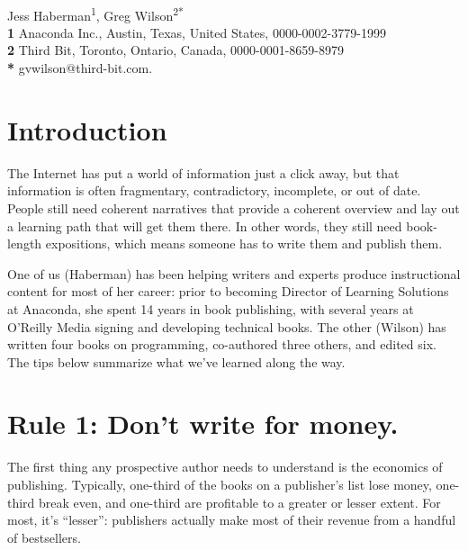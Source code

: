 \documentclass[10pt,letterpaper]{article}
\begin{document}
\vspace*{0.2in}

\begin{flushleft}
{\Large
\textbf{}
}
\newline
\\
{Jess Haberman}\textsuperscript{1},
{Greg Wilson}\textsuperscript{2*}
\\
\bigskip
\textbf{1} Anaconda Inc., Austin, Texas, United States, 0000-0002-3779-1999\\
\textbf{2} Third Bit, Toronto, Ontario, Canada, 0000-0001-8659-8979\\
\textbf{*} gvwilson@third-bit.com.
\end{flushleft}

\section*{Introduction}

The Internet has put a world of information just a click away,
but that information is often fragmentary, contradictory, incomplete, or out of date.
People still need coherent narratives that provide a coherent overview
and lay out a learning path that will get them there.
In other words,
they still need book-length expositions,
which means someone has to write them and publish them.

One of us (Haberman) has been helping writers and experts produce instructional content for most of her career:
prior to becoming Director of Learning Solutions at Anaconda, she spent 14 years in book publishing,
with several years at O'Reilly Media signing and developing technical books.
The other (Wilson) has written four books on programming,
co-authored three others,
and edited six.
The tips below summarize what we've learned along the way.

\section*{Rule 1: Don't write for money.}

The first thing any prospective author needs to understand is the economics of publishing.
Typically,
one-third of the books on a publisher's list lose money,
one-third break even,
and one-third are profitable to a greater or lesser extent.
For most, it's ``lesser'':
publishers actually make most of their revenue from a handful of bestsellers.
\end{document}
